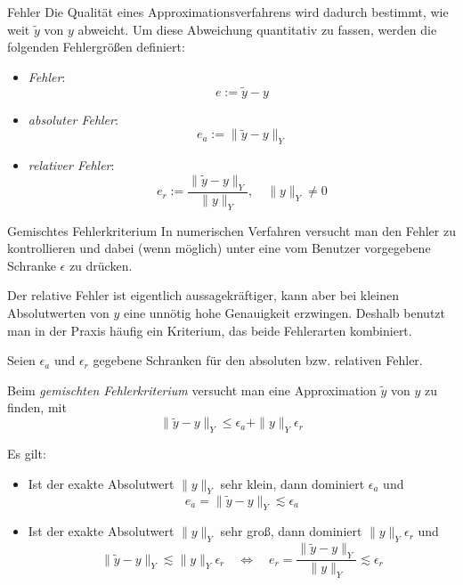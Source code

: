 \begin{defi}{Fehler}
    Die Qualität eines Approximationsverfahrens wird dadurch bestimmt, wie weit $\tilde{y}$ von $y$ abweicht.
    Um diese Abweichung quantitativ zu fassen, werden die folgenden Fehlergrößen definiert:
    \begin{itemize}
        \item \emph{Fehler}:
              \[
                  e := \tilde{y} - y
              \]
        \item \emph{absoluter Fehler}:
              \[
                  e_a := \| \tilde{y} - y \|_Y
              \]
        \item \emph{relativer Fehler}:
              \[
                  e_r := \frac{\| \tilde{y} - y \|_Y}{\| y \|_Y}, \quad \| y \|_Y \neq 0
              \]
    \end{itemize}
\end{defi}

\begin{defi}{Gemischtes Fehlerkriterium}
    In numerischen Verfahren versucht man den Fehler zu kontrollieren und dabei (wenn möglich) unter eine
    vom Benutzer vorgegebene Schranke $\epsilon$ zu drücken.

    Der relative Fehler ist eigentlich aussagekräftiger, kann aber bei kleinen Absolutwerten von $y$ eine unnötig hohe Genauigkeit erzwingen.
    Deshalb benutzt man in der Praxis häufig ein Kriterium, das beide Fehlerarten kombiniert.

    Seien $\epsilon_a$ und $\epsilon_r$ gegebene Schranken für den absoluten bzw. relativen Fehler.

    Beim \emph{gemischten Fehlerkriterium} versucht man eine Approximation $\tilde{y}$ von $y$ zu finden, mit
    \[
        \| \tilde{y} - y \|_Y \leq \epsilon_a + \| y \|_Y \epsilon_r
    \]

    Es gilt:
    \begin{itemize}
        \item Ist der exakte Absolutwert $\| y \|_Y$ sehr klein, dann dominiert $\epsilon_a$ und
              \[
                  e_a = \| \tilde{y} - y \|_Y \lesssim \epsilon_a
              \]
        \item Ist der exakte Absolutwert $\| y \|_Y$ sehr groß, dann dominiert $\|y \|_Y \epsilon_r$ und
              \[
                  \| \tilde{y} - y \|_Y \lesssim \|y \|_Y \epsilon_r \quad \iff \quad e_r = \frac{\| \tilde{y} - y \|_Y}{\| y \|_Y} \lesssim \epsilon_r
              \]
    \end{itemize}
\end{defi}

